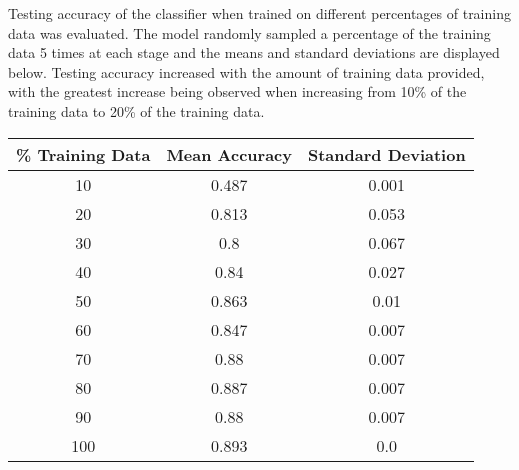 \documentclass[11pt]{article}
\begin{document}
    Testing accuracy of the classifier when trained on different percentages of training data was evaluated. The model randomly sampled a percentage of the training data 5 times at each stage and the means and standard deviations are displayed below. Testing accuracy increased with the amount of training data provided, with the greatest increase being observed when increasing from 10\% of the training data to 20\% of the training data.
    
    \begin{center}
    \begin{tabular}{||c c c||} 
     \hline
     \% Training Data & Mean Accuracy & Standard Deviation \\ [0.5ex] 
     \hline\hline
     10 & 0.487 & 0.001 \\ 
     \hline
     20 & 0.813 & 0.053 \\ 
     \hline
     30 & 0.8 & 0.067 \\ 
     \hline
     40 & 0.84 & 0.027 \\ 
     \hline
     50 & 0.863 & 0.01 \\ 
     \hline
     60 & 0.847 & 0.007 \\ 
     \hline
     70 & 0.88 & 0.007 \\ 
     \hline
     80 & 0.887 & 0.007 \\ 
     \hline
     90 & 0.88 & 0.007 \\ 
     \hline
     100 & 0.893 & 0.0 \\ 
     \hline
    \end{tabular}
    \end{center}
\end{document}
